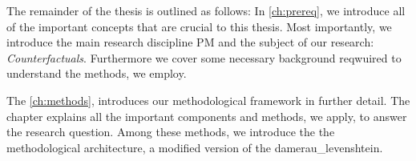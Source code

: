 \documentclass[./../../paper.tex]{subfiles}
\begin{document}
    The remainder of the thesis is outlined as follows: In \autoref{ch:prereq}, we introduce all of the important concepts that are crucial to this thesis. Most importantly, we introduce the main research discipline \Gls{PM} and the subject of our research: \emph{Counterfactuals}. Furthermore we cover some necessary background reqwuired to understand the methods, we employ.
    
    
    



    

    The \autoref{ch:methods}, introduces our methodological framework in further detail. The chapter explains all the important components and methods, we apply, to answer the research question. Among these methods, we introduce the the methodological architecture, a modified version of the \Gls{damerau_levenshtein}.
\end{document}

